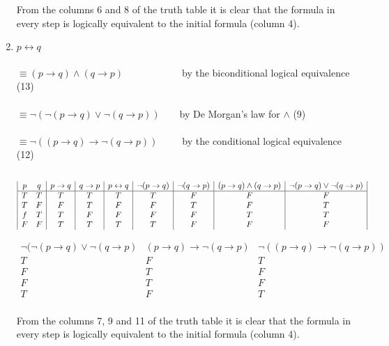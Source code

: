 \documentclass[a4paper,11pt]{article}
\begin{document}
\begin{enumerate}
        From the columns 6 and 8 of the truth table it is clear that the formula in every step is logically equivalent to the initial formula (column 4).\\
    \item %
        $p \leftrightarrow q$\\\\
        $\equiv (p \rightarrow q) \wedge (q \rightarrow p)$~~~~~~~~~~~~by the biconditional logical equivalence (13)\\\\
        $\equiv \neg(\neg(p \rightarrow q) \vee \neg(q \rightarrow p))$~~~~by De Morgan's law for $\wedge$ (9)\\\\
        $\equiv \neg((p \rightarrow q) \rightarrow \neg(q \rightarrow p))$~~~~~by the conditional logical equivalence (12)\\\\        
        \begin{displaymath}
        \begin{array}{|c c|c|c|c|c|c|c|c|c|c|c|}
        p & q & p \rightarrow q & q \rightarrow p & p \leftrightarrow q & \neg(p \rightarrow q) & \neg(q \rightarrow p) & (p \rightarrow q) \wedge (q \rightarrow p) & \neg(p \rightarrow q) \vee \neg(q \rightarrow p)\\
        \hline %
        T & T & T & T & T & T & F & F & F\\
        T & F & F & T & F & F & T & F & T\\
        f & T & T & F & F & F & F & T & T\\
        F & F & T & T & T & T & F & F & F\\
        \end{array}
        \end{displaymath}

        \begin{displaymath}
        \begin{array}{|c|c|c|}
        \neg(\neg(p \rightarrow q) \vee \neg(q \rightarrow p) & (p \rightarrow q) \rightarrow \neg(q \rightarrow p) & \neg((p \rightarrow q) \rightarrow \neg(q \rightarrow p))\\
        \hline %
        T & F & T\\
        F & T & F\\
        F & T & F\\
        T & F & T\\
        \end{array}
        \end{displaymath}

        From the columns 7, 9 and 11 of the truth table it is clear that the formula in every step is logically equivalent to the initial formula (column 4).
        \\
\end{enumerate}
\end{document}
